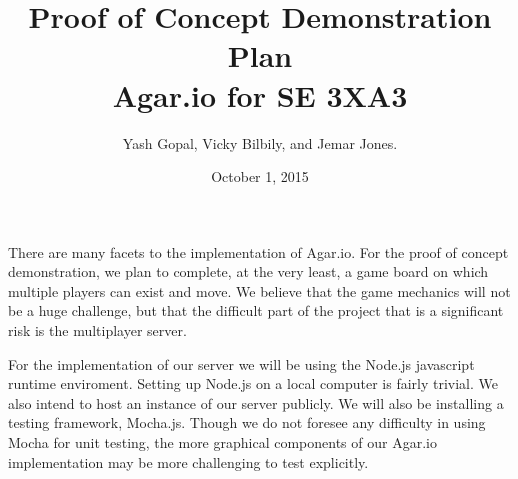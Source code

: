 \documentclass{article}
\begin{document}
\title{Proof of Concept Demonstration Plan\\
	\large Agar.io for SE 3XA3}
\author{Yash Gopal, Vicky Bilbily, and Jemar Jones.}
\date{October 1, 2015}
\maketitle



	 There are many facets to the implementation of Agar.io. For the proof of concept demonstration, we plan to complete, at the very least, a game board on which multiple players can exist and move. We believe that the game mechanics will not be a huge challenge, but that the difficult part of the project that is a significant risk is the multiplayer server.


	For the implementation of our server we will be using the Node.js javascript runtime enviroment. Setting up Node.js on a local computer is fairly trivial. We also intend to host an instance of our server publicly. We will also be installing a testing framework, Mocha.js. Though we do not foresee any difficulty in using Mocha for unit testing, the more graphical components of our Agar.io implementation may be more challenging to test explicitly.
\end{document}
